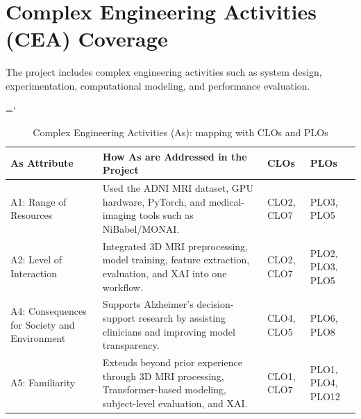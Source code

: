 \section{Complex Engineering Activities (CEA) Coverage}
The project includes complex engineering activities such as system design, experimentation, computational modeling, and performance evaluation.
\begin{sloppypar}
\hyphenchar\font=`\-
\begin{longtable}{|p{3.2cm}|p{6.6cm}|p{2.1cm}|p{2.1cm}|}
\caption{Complex Engineering Activities (As): mapping with CLOs and PLOs}\\
\hline
\textbf{As Attribute} & \textbf{How As are Addressed in the Project} & \textbf{CLOs} & \textbf{PLOs}\\
\hline
A1: Range of Resources & Used the ADNI MRI dataset, GPU hardware, PyTorch, and medical-imaging tools such as NiBabel/MONAI. & CLO2, CLO7 & PLO3, PLO5\\
\hline
A2: Level of Interaction & Integrated 3D MRI preprocessing, model training, feature extraction, evaluation, and XAI into one workflow. & CLO2, CLO7 & PLO2, PLO3, PLO5\\
\hline
A4: Consequences for Society and Environment & Supports Alzheimer's decision-support research by assisting clinicians and improving model transparency. & CLO4, CLO5 & PLO6, PLO8\\
\hline
A5: Familiarity & Extends beyond prior experience through 3D MRI processing, Transformer-based modeling, subject-level evaluation, and XAI. & CLO1, CLO7 & PLO1, PLO4, PLO12\\
\hline
\end{longtable}
\end{sloppypar}


